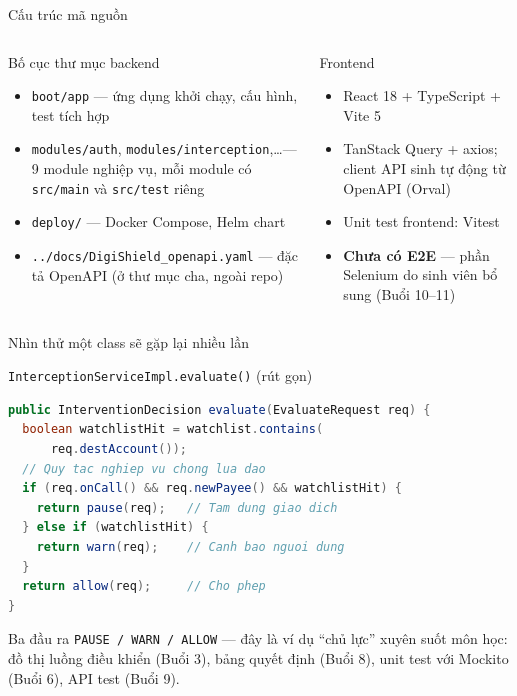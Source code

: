 \documentclass[aspectratio=169,12pt]{beamer}
\begin{document}
\begin{frame}{Cấu trúc mã nguồn}
  \begin{columns}
    \begin{block}{Bố cục thư mục backend}
      \small
      \begin{itemize}
        \item \texttt{boot/app} --- ứng dụng khởi chạy, cấu hình, test tích hợp
        \item \texttt{modules/auth}, \texttt{modules/interception},\ldots ---
              9 module nghiệp vụ, mỗi module có \texttt{src/main} và \texttt{src/test} riêng
        \item \texttt{deploy/} --- Docker Compose, Helm chart
        \item \texttt{../docs/\allowbreak DigiShield\_openapi.yaml} --- đặc tả OpenAPI
              (ở thư mục cha, ngoài repo)
      \end{itemize}
    \end{block}

    \begin{block}{Frontend}
      \small
      \begin{itemize}
        \item React 18 + TypeScript + Vite 5
        \item TanStack Query + axios; client API sinh tự động từ OpenAPI (Orval)
        \item Unit test frontend: Vitest
        \item \textbf{Chưa có E2E} --- phần Selenium do sinh viên bổ sung (Buổi 10--11)
      \end{itemize}
    \end{block}
  \end{columns}
\end{frame}

\begin{frame}[fragile,shrink=8]{Nhìn thử một class sẽ gặp lại nhiều lần}
  \begin{block}{\small \texttt{InterceptionServiceImpl.evaluate()} (rút gọn)}
\begin{lstlisting}[language=java,basicstyle=\ttfamily\footnotesize]
public InterventionDecision evaluate(EvaluateRequest req) {
  boolean watchlistHit = watchlist.contains(
      req.destAccount());
  // Quy tac nghiep vu chong lua dao
  if (req.onCall() && req.newPayee() && watchlistHit) {
    return pause(req);   // Tam dung giao dich
  } else if (watchlistHit) {
    return warn(req);    // Canh bao nguoi dung
  }
  return allow(req);     // Cho phep
}
\end{lstlisting}
  \end{block}

  \vspace{0.2em}
  \small Ba đầu ra \texttt{PAUSE / WARN / ALLOW} --- đây là ví dụ ``chủ lực''
  xuyên suốt môn học: đồ thị luồng điều khiển (Buổi 3), bảng quyết định (Buổi 8),
  unit test với Mockito (Buổi 6), API test (Buổi 9).
\end{frame}
\end{document}
